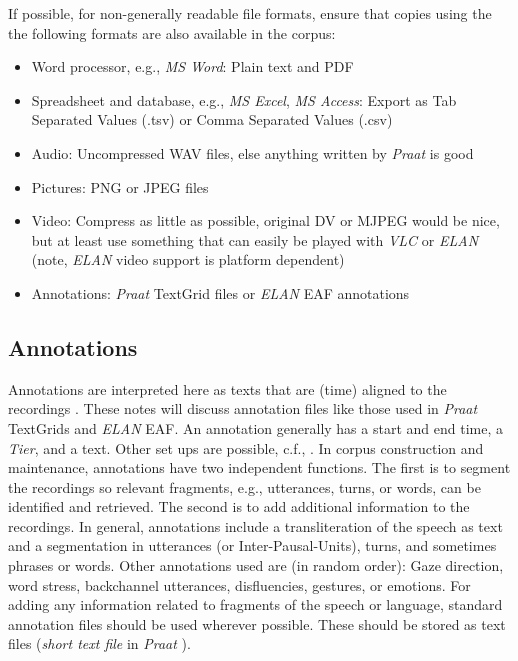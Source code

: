 \documentclass[10pt, a4paper]{article}
\begin{document}
If possible, for non-generally readable file formats, ensure that copies using the the following formats are also available in the corpus:
\begin{itemize}
\item {\sc Word processor}, e.g., \emph{MS Word}: Plain text and PDF
\item {\sc Spreadsheet and database}, e.g., \emph{MS Excel}, \emph{MS Access}: Export as Tab Separated Values (.tsv) or Comma Separated Values (.csv)
\item {\sc Audio}: Uncompressed WAV files, else anything written by \emph{Praat} \cite{Praat} is good
\item {\sc Pictures}: PNG or JPEG files
\item {\sc Video}: Compress as little as possible, original DV or MJPEG would be nice, but at least use something that can easily be played with \emph{VLC} \cite{VideoLAN} or \emph{ELAN} \cite{ELAN} (note, \emph{ELAN} video support is platform dependent)
\item {\sc Annotations}: \emph{Praat} \cite{Praat} TextGrid files or \emph{ELAN} \cite{ELAN} EAF annotations
\end{itemize}

\subsection{Annotations}

Annotations are interpreted here as texts that are (time) aligned to the recordings \cite{bird2001formal}. These notes will discuss annotation files like those used in \emph{Praat} \cite{Praat} TextGrids and \emph{ELAN} \cite{ELAN} EAF. An annotation generally has a start and end time, a \emph{Tier}, and a text. Other set ups are possible, c.f., \cite{bird2001formal,oostdijk2000spoken,oostdijk2001design}. In corpus construction and maintenance, annotations have two independent functions. The first is to segment the recordings so relevant fragments, e.g., utterances, turns, or words, can be identified and retrieved. The second is to add additional information to the recordings. In general, annotations include a transliteration of the speech as text and a segmentation in utterances (or Inter-Pausal-Units), turns, and sometimes phrases or words. Other annotations used are (in random order): Gaze direction, word stress, backchannel utterances, disfluencies, gestures, or emotions. For adding any information related to fragments of the speech or language, standard annotation files should be used wherever possible. These should be stored as text files (\emph{short text file} in \emph{Praat} \cite{Praat}).
\end{document}

